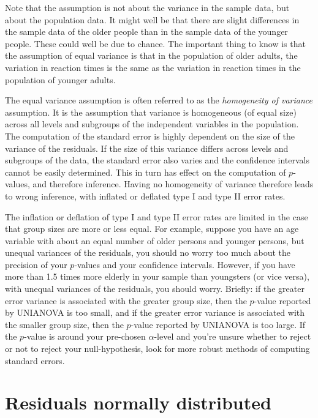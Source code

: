 \documentclass[]{report}\usepackage[]{graphicx}\usepackage[]{color}
\begin{document}
Note that the assumption is not about the variance in the sample data, but about the population data. It might well be that there are slight differences in the sample data of the older people than in the sample data of the younger people. These could well be due to chance. The important thing to know is that the assumption of equal variance is that in the population of older adults, the variation in reaction times is the same as the variation in reaction times in the population of younger adults. 

The equal variance assumption is often referred to as the \textit{homogeneity of variance} assumption. It is the assumption that variance is homogeneous (of equal size) across all levels and subgroups of the independent variables in the population. The computation of the standard error is highly dependent on the size of the variance of the residuals. If the size of this variance differs across levels and subgroups of the data, the standard error also varies and the confidence intervals cannot be easily determined. This in turn has effect on the computation of $p$-values, and therefore inference. Having no homogeneity of variance therefore leads to wrong inference, with inflated or deflated type I and type II error rates. 

The inflation or deflation of type I and type II error rates are limited in the case that group sizes are more or less equal. For example, suppose you have an age variable with about an equal number of older persons and younger persons, but unequal variances of the residuals, you should no worry too much about the precision of your $p$-values and your confidence intervals. However, if you have more than 1.5 times more elderly in your sample than youngsters (or vice versa), with unequal variances of the residuals, you should worry. Briefly: if the greater error variance is associated with the greater group size, then the $p$-value reported by UNIANOVA is too small, and if the greater error variance is associated with the smaller group size, then the $p$-value reported by UNIANOVA is too large. If the $p$-value is around your pre-chosen $\alpha$-level and you're unsure whether to reject or not to reject your null-hypothesis, look for more robust methods of computing standard errors.  


\section{Residuals normally distributed}
\end{document}
